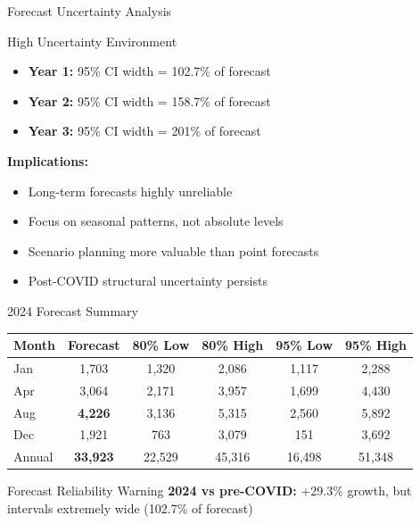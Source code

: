\documentclass[10pt]{beamer}
\begin{document}
\begin{frame}{Forecast Uncertainty Analysis}
\begin{alertblock}{High Uncertainty Environment}
\begin{itemize}
\item \textbf{Year 1:} 95\% CI width = 102.7\% of forecast
\item \textbf{Year 2:} 95\% CI width = 158.7\% of forecast  
\item \textbf{Year 3:} 95\% CI width = 201\% of forecast
\end{itemize}
\end{alertblock}

\textbf{Implications:}
\begin{itemize}
\item Long-term forecasts highly unreliable
\item Focus on seasonal patterns, not absolute levels
\item Scenario planning more valuable than point forecasts
\item Post-COVID structural uncertainty persists
\end{itemize}
\end{frame}



\begin{frame}{2024 Forecast Summary}
\begin{table}[h]
\centering
\footnotesize
\begin{tabular}{lccccc}
\toprule
Month & Forecast & 80\% Low & 80\% High & 95\% Low & 95\% High \\
\midrule
Jan & 1,703 & 1,320 & 2,086 & 1,117 & 2,288 \\
Apr & 3,064 & 2,171 & 3,957 & 1,699 & 4,430 \\
Aug & \textbf{4,226} & 3,136 & 5,315 & 2,560 & 5,892 \\
Dec & 1,921 & 763 & 3,079 & 151 & 3,692 \\
\midrule
Annual & \textbf{33,923} & 22,529 & 45,316 & 16,498 & 51,348 \\
\bottomrule
\end{tabular}
\end{table}


\begin{alertblock}{Forecast Reliability Warning}
\textbf{2024 vs pre-COVID:} +29.3\% growth, but intervals extremely wide (102.7\% of forecast)
\end{alertblock}
\end{frame}
\end{document}
